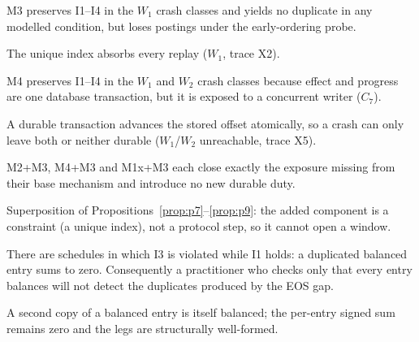 \begin{proposition}
\label{prop:p8}
M3 preserves I1--I4 in the $W_1$ crash classes and yields no duplicate in any modelled condition,
but loses postings under the early-ordering probe.
\end{proposition}
\begin{proofsketch}
The unique index absorbs every replay ($W_1$, trace X2).
\end{proofsketch}

\begin{proposition}
\label{prop:p9}
M4 preserves I1--I4 in the $W_1$ and $W_2$ crash classes because effect and progress are one
database transaction, but it is exposed to a concurrent writer ($C_7$).
\end{proposition}
\begin{proofsketch}
A durable transaction advances the stored offset atomically, so a crash can only leave both or
neither durable ($W_1$/$W_2$ unreachable, trace X5).
\end{proofsketch}

\begin{proposition}[Combinations]
\label{prop:p10}
M2+M3, M4+M3 and M1x+M3 each close exactly the exposure missing from their base mechanism and
introduce no new durable duty.
\end{proposition}
\begin{proofsketch}
Superposition of Propositions~\ref{prop:p7}--\ref{prop:p9}: the added component is a constraint
(a unique index), not a protocol step, so it cannot open a window.
\end{proofsketch}

\begin{proposition}
\label{prop:p11}
There are schedules in which I3 is violated while I1 holds: a duplicated balanced entry sums to
zero. Consequently a practitioner who checks only that every entry balances will not detect the
duplicates produced by the EOS gap.
\end{proposition}
\begin{proofsketch}
A second copy of a balanced entry is itself balanced; the per-entry signed sum remains zero and
the legs are structurally well-formed.
\end{proofsketch}

